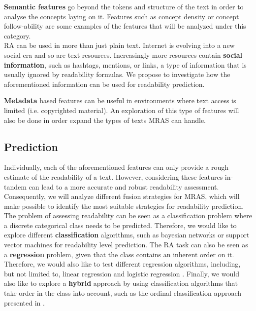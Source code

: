 \documentclass{bsu-ms}
\begin{document}
\noindent
\textbf{Semantic features} go beyond the tokens and structure of the text in order to analyse the concepts laying on it. %
 Features such as concept density or concept follow-ability are some examples of the features that will be analyzed under this category.\\

\noindent
RA can be used in more than just plain text. Internet is evolving into a new social era and so are text resources. Increasingly more resources contain \textbf{social information}, such as hashtags, mentions, or links, a type of information that is usually ignored by readability formulas. We propose to investigate how the aforementioned information can be used for readability prediction.

\noindent
\textbf{Metadata} based features can be useful in environments where text access is limited (i.e. copyrighted material). An exploration of this type of features will also be done in order expand the types of texts MRAS can handle.






\subsection{Prediction}

Individually, each of the aforementioned features can only provide a rough estimate of the readability of a text. However, considering these features in-tandem can lead to a more accurate and robust readability assessment. Consequently, we will analyze different fusion strategies for MRAS, which will make possible to identify the most suitable strategies for readability prediction. The problem of assessing readability can be seen as a classification problem where a discrete categorical class needs to be predicted. Therefore, we would like to  explore different \textbf{classification} algorithms, such as bayesian networks \cite{nielsen2009bayesian} or support vector machines \cite{cortes1995support} for readability level prediction.  The RA task can also be seen as a \textbf{regression} problem, given that the class contains an inherent order on it. Therefore, we would also like to test different regression algorithms, including, but not limited to, linear regression \cite{neter1996applied} and logistic regression \cite{walker1967estimation}. Finally, we would also like to  explore a \textbf{hybrid} approach by using classification algorithms that take order in the class into account, such as the ordinal classification approach presented in \cite{frank2001simple}.
\end{document}
